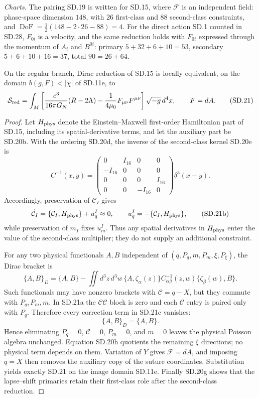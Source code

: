 \documentclass[10pt]{article}
\newcommand{\DoF}{\operatorname{DoF}}
\begin{document}
\par\noindent
\emph{Charts.} The pairing SD.19 is written for SD.15, where $\mathcal F$ is an
independent field: phase-space dimension $148$, with $26$ first-class and $88$
second-class constraints, and $\DoF=\frac12(148-2\cdot26-88)=4$. For the
direct action SD.1 counted in SD.28, $F_{0i}$ is a velocity, and the same
reduction holds with $F_{0i}$ expressed through the momentum of $A_i$ and
$B^{0i}$: primary $5+32+6+10=53$, secondary $5+6+10+16=37$, total
$90=26+64$.

\begin{theorem}
On the regular branch, Dirac reduction of SD.15 is locally equivalent, on the
domain $b(g,F)<|\chi|$ of SD.11e, to
\[
\mathcal S_{\rm red}=\int_M\left[
\frac{c^3}{16\pi G_N}(R-2\Lambda)
-\frac1{4\mu_0}F_{\mu\nu}F^{\mu\nu}
\right]\sqrt{-g}\,d^4x,
\qquad F=dA.
\tag{SD.21}
\]
\par\noindent
\end{theorem}

\begin{proof}
Let $H_{\rm phys}$ denote the Einstein--Maxwell first-order Hamiltonian part
of SD.15, including its spatial-derivative terms, and let the auxiliary part
be SD.20b.  With the ordering SD.20d, the inverse of the second-class kernel
SD.20e is
\[
C^{-1}(x,y)=
\begin{pmatrix}
0&I_{16}&0&0\\
-I_{16}&0&0&0\\
0&0&0&I_{16}\\
0&0&-I_{16}&0
\end{pmatrix}\delta^3(x-y).
\tag{SD.21a}
\]
Accordingly, preservation of $\mathcal C_I$ gives
\[
\dot{\mathcal C}_I
=\{\mathcal C_I,H_{\rm phys}\}+u_q^I\approx0,
\qquad
u_q^I=-\{\mathcal C_I,H_{\rm phys}\},
\tag{SD.21b}
\]
while preservation of $m_I$ fixes $u_m^I$.  Thus any spatial derivatives in
$H_{\rm phys}$ enter the value of the second-class multiplier; they do not
supply an additional constraint.

For any two physical functionals $A,B$ independent of
$(q,P_q,m,P_m,\xi,P_\xi)$, the Dirac bracket is
\[
\{A,B\}_D=\{A,B\}
-\iint d^3z\,d^3w\,
\{A,\zeta_\alpha(z)\}C^{-1}_{\alpha\beta}(z,w)
\{\zeta_\beta(w),B\}.
\tag{SD.21c}
\]
Such functionals may have nonzero brackets with
$\mathcal C=q-X$, but they commute with $P_q,P_m,m$.  In SD.21a the
$\mathcal C\mathcal C$ block is zero and each $\mathcal C$ entry is paired
only with $P_q$.  Therefore every correction term in SD.21c vanishes:
\[
\boxed{\{A,B\}_D=\{A,B\}}.
\tag{SD.21d}
\]
Hence eliminating
$P_q=0$, $\mathcal C=0$, $P_m=0$, and $m=0$ leaves the physical Poisson
algebra unchanged.  Equation SD.20h quotients the remaining $\xi$ directions;
no physical term depends on them.  Variation of $Y$ gives
$\mathcal F=dA$, and imposing $q=X$ then removes the auxiliary copy of the
suture coordinates.  Substitution yields exactly SD.21 on the image domain
SD.11e.  Finally SD.20g shows that the lapse--shift primaries retain their
first-class role after the second-class reduction.
\end{proof}
\end{document}
